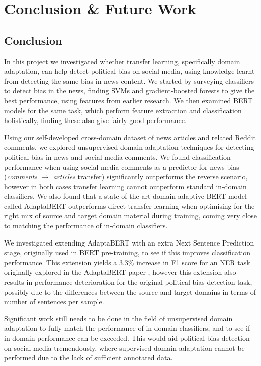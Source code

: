 \chapter{Conclusion \& Future Work}

\section{Conclusion}

In this project we investigated whether transfer learning, specifically domain adaptation, can help detect political bias on social media, using knowledge learnt from detecting the same bias in news content. We started by surveying classifiers to detect bias in the news, finding SVMs and gradient-boosted forests to give the best performance, using features from earlier research. We then examined BERT models for the same task, which perform feature extraction and classification holistically, finding these also give fairly good performance.

Using our self-developed cross-domain dataset of news articles and related Reddit comments, we explored unsupervised domain adaptation techniques for detecting political bias in news and social media comments. We found classification performance when using social media comments as a predictor for news bias (\textit{comments $ \rightarrow $ articles} transfer) significantly outperforms the reverse scenario, however in both cases transfer learning cannot outperform standard in-domain classifiers. We also found that a state-of-the-art domain adaptive BERT model called AdaptaBERT outperforms direct transfer learning when optimising for the right mix of source and target domain material during training, coming very close to matching the performance of in-domain classifiers.

We investigated extending AdaptaBERT with an extra Next Sentence Prediction stage, originally used in BERT pre-training, to see if this improves classification performance. This extension yields a 3.3\% increase in F1 score for an NER task originally explored in the AdaptaBERT paper \cite{adaptabert}, however this extension also results in performance deterioration for the original political bias detection task, possibly due to the differences between the source and target domains in terms of number of sentences per sample.

Significant work still needs to be done in the field of unsupervised domain adaptation to fully match the performance of in-domain classifiers, and to see if in-domain performance can be exceeded. This would aid political bias detection on social media tremendously, where supervised domain adaptation cannot be performed due to the lack of sufficient annotated data.

